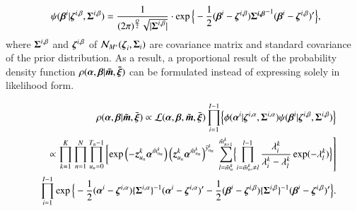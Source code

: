 \documentclass[a4paper,oneside,onecolumn,preprint,10pt,authoryear]{elsarticle}
\begin{document}
%
   \begin{eqnarray}
      && \hspace{-2mm}
      \psi(\mbox{\boldmath$\beta$}^i|
      \mbox{\boldmath$\zeta$}^{i,\beta},\mbox{\boldmath$\Sigma$}^{i,\beta})
      = \frac{1}{(2\pi)^{\frac{Q}{2}}\sqrt{|\mbox{\boldmath$\Sigma$}^{i,\beta}|}}
      \cdot \exp\Big\{-\frac{1}{2}(\mbox{\boldmath$\beta$}^i
      -\mbox{\boldmath$\zeta$}^{i,\beta})
      \mbox{\boldmath$\Sigma^{i,\beta}$}^{-1}
      (\mbox{\boldmath$\beta$}^i-\mbox{\boldmath$\zeta$}^{i,\beta})^\prime\Big\},
            \label{Kseiki1}
   \end{eqnarray}
where $\mbox{\boldmath$\Sigma$}^{i,\beta}$ and $\mbox{\boldmath$\zeta$}^{i,\beta}$ of ${\cal N}_{M^*}(\mbox{\boldmath$\zeta$}_i,\mbox{\boldmath$\Sigma$}_i)$  are covariance matrix and standard covariance of the prior distribution. As a result, a proportional result of the probability density function $\rho(\mbox{\boldmath$\alpha$},\mbox{\boldmath$\beta$}|\mbox{\boldmath$\bar{m}$},\mbox{\boldmath$\bar{\xi}$})$ can be formulated instead of expressing solely in likelihood form.

%
\begin{eqnarray}
      && \rho(\mbox{\boldmath$\alpha$},\mbox{\boldmath$\beta$}|\tilde{\mbox{\boldmath$m$}},\bar{\mbox{\boldmath$\xi$}}) 
      \propto {\cal L}(\mbox{\boldmath$\alpha$},\mbox{\boldmath$\beta$},\tilde{\mbox{\boldmath$m$}},\bar{\mbox{\boldmath$\xi$}})\prod_{i=1}^{I-1}\Bigl\{\phi(\mbox{\boldmath$\alpha$}^i|\mbox{\boldmath$\zeta$}^{i,\alpha},\mbox{\boldmath$\Sigma$}^{i,\alpha}) 
\psi(\mbox{\boldmath$\beta$}^i|\mbox{\boldmath$\zeta$}^{i,\beta},\mbox{\boldmath$\Sigma$}^{i,\beta})\Bigl\}
      \nonumber \\
      && \propto \prod_{k=1}^K \prod_{n=1}^{N} \prod_{u_n=0}^{T_n-1} \left[
            \exp\left(- \mbox{\boldmath$z$}_{u_n}^k\mbox{\boldmath$\alpha$}^{\tilde{m}_{u_n}^k} \right)\left(
      \mbox{\boldmath$z$}_{u_n}^k\mbox{\boldmath$\alpha$}^{\tilde{m}_{u_n}^k}\right)^{\bar{y}_{u_n}^k} \right.
       \left. \sum_{l=\tilde{m}_{n}^k}^{\tilde{m}_{n+1}^k} \Bigl\{ \prod_{i=\tilde{m}_{n}^k,\neq l}^{l-1}\frac{\lambda_i^k}{\lambda_{i}^k-\lambda_{l}^k} \exp (-\lambda_{l}^k)\Bigr\} \right] \nonumber \\
      && \prod_{i=1}^{I-1}
      \exp\Big\{-\frac{1}{2}(\mbox{\boldmath$\alpha$}^i
      -\mbox{\boldmath$\zeta$}^{i,\alpha})
      \{\mbox{\boldmath$\Sigma$}^{i,\alpha}\}^{-1}
      (\mbox{\boldmath$\alpha$}^{i}-\mbox{\boldmath$\zeta$}^{i,\alpha})^\prime 
       -\frac{1}{2}
      (\mbox{\boldmath$\beta$}^{i}-\mbox{\boldmath$\zeta$}^{i,\beta})
      \{\mbox{\boldmath$\Sigma$}^{i,\beta}\}^{-1}
      (\mbox{\boldmath$\beta$}^{i}-\mbox{\boldmath$\zeta$}^{i,\beta})^\prime\Big\}. \label{post1}
   \end{eqnarray}
\end{document}
